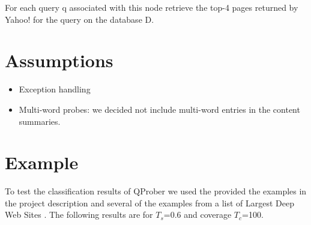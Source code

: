 \documentclass[11pt]{article}
\begin{document}
    For each query q associated with this node retrieve the top-4 pages returned by Yahoo! for the query on the database D.


\section{Assumptions}

\begin{itemize}
\item Exception handling
\item Multi-word probes: we decided not include multi-word entries in the content summaries.
\end{itemize}

\section{Example}
To test the classification results of QProber we used the provided the examples in the project description and several of the examples from a list
of Largest Deep Web Sites \cite{AIP}. The following results are for $T_s$=0.6 and coverage $T_c$=100.
\end{document}
